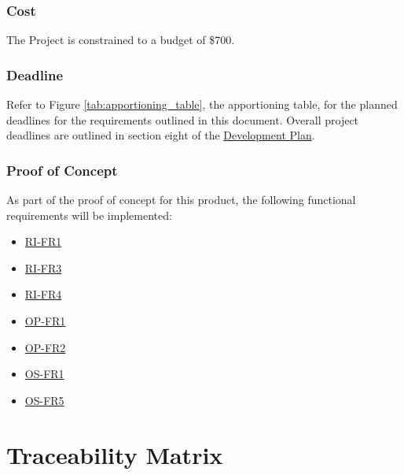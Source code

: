 \documentclass{article}
\begin{document}
\subsubsection{Cost}

The Project is constrained to a budget of \$700.

\subsubsection{Deadline}

Refer to Figure \ref{tab:apportioning_table}, the apportioning table, for the planned deadlines for the requirements outlined in this document. Overall project deadlines are outlined in section eight of the \href{https://github.com/russellrd/realm/blob/main/docs/DevelopmentPlan/DevelopmentPlan.pdf}{Development Plan}.

\subsubsection{Proof of Concept}

As part of the proof of concept for this product, the following functional requirements will be implemented:

\begin{itemize}
    \item \hyperref[ssub:realm_interface]{RI-FR1}
    \item \hyperref[ssub:realm_interface]{RI-FR3}
    \item \hyperref[ssub:realm_interface]{RI-FR4}
    \item \hyperref[ssub:object_placement]{OP-FR1}
    \item \hyperref[ssub:object_placement]{OP-FR2}
    \item \hyperref[ssub:obj_scan]{OS-FR1}
    \item \hyperref[ssub:obj_scan]{OS-FR5}
\end{itemize}

\section{Traceability Matrix}
\newpage
\end{document}
